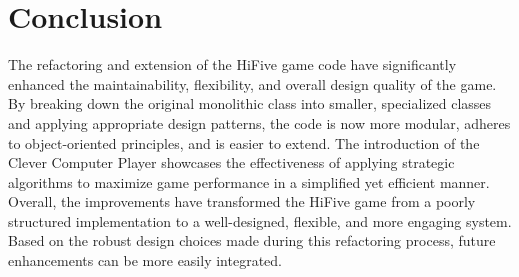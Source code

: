 \documentclass[a4paper, 12pt]{report}
\begin{document}
    \newpage

    \chapter{Conclusion}
    The refactoring and extension of the HiFive game code have significantly enhanced the maintainability, flexibility, and overall design quality of the game. By breaking down the original monolithic class into smaller, specialized classes and applying appropriate design patterns, the code is now more modular, adheres to object-oriented principles, and is easier to extend. The introduction of the Clever Computer Player showcases the effectiveness of applying strategic algorithms to maximize game performance in a simplified yet efficient manner. Overall, the improvements have transformed the HiFive game from a poorly structured implementation to a well-designed, flexible, and more engaging system. Based on the robust design choices made during this refactoring process, future enhancements can be more easily integrated.
    
    
\end{document}
